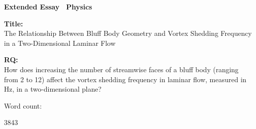 \documentclass[12pt]{article}
\begin{document}
	
\doublespacing

\begin{titlepage}
	\begin{center}
		\textbf{Extended Essay \textemdash\ Physics}
		
		\vspace*{4cm}
		
		\textbf{Title:}\\
		The Relationship Between Bluff Body Geometry and Vortex Shedding Frequency in a Two-Dimensional Laminar Flow
		\vspace{1cm}
		
		\textbf{RQ:}\\
		How does increasing the number of streamwise faces of a bluff body (ranging from 2 to 12) affect the vortex shedding frequency in laminar flow, measured in \si{\hertz}, in a two-dimensional plane?
		\vspace{4cm}
		
		Word count:
		
		3843
		\vfill
		
		\vspace{0.1cm}
	\end{center}
\end{titlepage}
	
	
\tableofcontents
\newpage
\listoffigures
\newpage
	









\printbibliography

\clearpage

\appendix
{}



	
\end{document}
